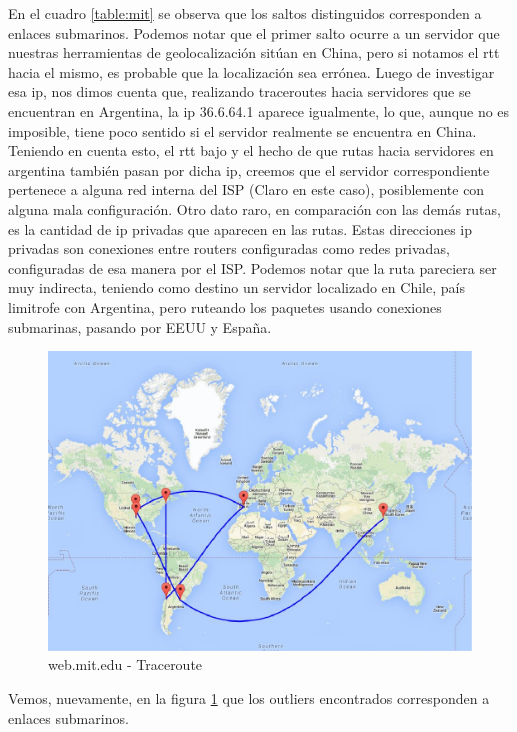 En el cuadro \ref{table:mit} se observa que los saltos distinguidos corresponden a enlaces submarinos. Podemos notar que el primer salto ocurre a un servidor que nuestras herramientas de geolocalización sitúan en China, pero si notamos el rtt hacia el mismo, es probable que la localización sea errónea. Luego de investigar esa ip, nos dimos cuenta que, realizando traceroutes hacia servidores que se encuentran en Argentina, la ip 36.6.64.1 aparece igualmente, lo que, aunque no es imposible, tiene poco sentido si el servidor realmente se encuentra en China. \\
    Teniendo en cuenta esto, el rtt bajo y el hecho de que rutas hacia servidores en  argentina también pasan por dicha ip, creemos que el servidor correspondiente pertenece a alguna red interna del ISP (Claro en este caso), posiblemente con alguna mala configuración.
    Otro dato raro, en comparación con las demás rutas, es la cantidad de ip privadas que aparecen en las rutas. Estas direcciones ip privadas son conexiones entre routers configuradas como redes privadas, configuradas de esa manera por el ISP.
    Podemos notar que la ruta pareciera ser muy indirecta, teniendo como destino un servidor localizado en Chile, país limitrofe con Argentina, pero ruteando los paquetes usando conexiones submarinas, pasando por EEUU y España.


\begin{figure}[H]
    \begin{center}
        \includegraphics[width=1\textwidth]{data/mapa-mit.jpg}
        \caption{web.mit.edu - Traceroute}
        \label{mapa:mit}
    \end{center}
\end{figure}

Vemos, nuevamente, en la figura \ref{mapa:mit} que los outliers encontrados corresponden a enlaces submarinos.

